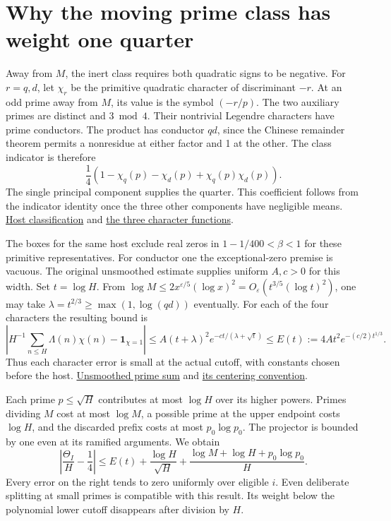 \documentclass[12pt,letterpaper]{article}
\newcommand{\orig}[3]{\href{https://github.com/nousentllc/riemann-hypothesis/blob/40e56bab026552e089d7afcfeff08d2defb9c005/src/#1.lean\#L#2}{#3}}
\newcommand{\pagepart}[1]{\clearpage\section{#1}}
\begin{document}
\pagepart{Why the moving prime class has weight one quarter}
Away from \(M\), the inert class requires both quadratic signs to be negative. For \(r=q,d\), let \(\chi_r\) be the primitive quadratic character of discriminant \(-r\). At an odd prime away from \(M\), its value is the symbol \((-r/p)\). The two auxiliary primes are distinct and \(3\bmod 4\). Their nontrivial Legendre characters have prime conductors. The product has conductor \(qd\), since the Chinese remainder theorem permits a nonresidue at either factor and 1 at the other. The class indicator is therefore
\[
 \frac14(1-\chi_q(p)-\chi_d(p)+\chi_q(p)\chi_d(p)).
\]
The single principal component supplies the quarter. This coefficient follows from the indicator identity once the three other components have negligible means. \orig{Formalism/LocalRingCardinality/HostCls}{111}{Host classification} and \orig{Formalism/SharpRestriction/GlobalSchurBounds/Joints}{982}{the three character functions}.

The boxes for the same host exclude real zeros in \(1-1/400<\beta<1\) for these primitive representatives. For conductor one the exceptional-zero premise is vacuous. The original unsmoothed estimate supplies uniform \(A,c>0\) for this width. Set \(t=\log H\). From \(\log M\le 2x^{\varepsilon/5}(\log x)^2=O_\varepsilon(t^{3/5}(\log t)^2)\), one may take \(\lambda=t^{2/3}\ge\max(1,\log(qd))\) eventually. For each of the four characters the resulting bound is
\[
 \left|H^{-1}\sum_{n\le H}\Lambda(n)\chi(n)-\mathbf1_{\chi=1}\right|
 \le A(t+\lambda)^2e^{-ct/(\lambda+\sqrt t)}
 \le E(t):=4At^2e^{-(c/2)t^{1/3}} .
\]
Thus each character error is small at the actual cutoff, with constants chosen before the host. \orig{Development/AutomorphicArithmetic/MeanSquareBounds/PsiThin}{385}{Unsmoothed prime sum} and \orig{Formalism/PeriodIntegrals/ExplicitFormula}{5}{its centering convention}.

Each prime \(p\le\sqrt H\) contributes at most \(\log H\) over its higher powers. Primes dividing \(M\) cost at most \(\log M\), a possible prime at the upper endpoint costs \(\log H\), and the discarded prefix costs at most \(p_0\log p_0\). The projector is bounded by one even at its ramified arguments. We obtain
\[
 \left|\frac{\Theta_I}{H}-\frac14\right|
 \le E(t)+\frac{\log H}{\sqrt H}
       +\frac{\log M+\log H+p_0\log p_0}{H}.
\]
Every error on the right tends to zero uniformly over eligible \(i\). Even deliberate splitting at small primes is compatible with this result. Its weight below the polynomial lower cutoff disappears after division by \(H\).
\end{document}
